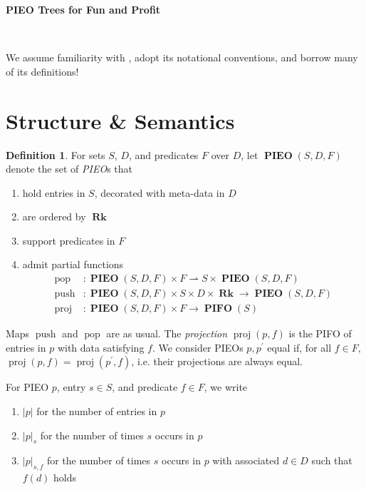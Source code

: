 \documentclass{amsart}
\makeatletter
\DeclareMathOperator{\halfto}{\rightharpoonup}
\DeclareMathOperator{\push}{\mathrm{push}}
\DeclareMathOperator{\pop}{\mathrm{pop}}
\DeclareMathOperator{\proj}{\mathrm{proj}}
\DeclareMathOperator{\Rk}{\mathbf{Rk}}
\DeclareMathOperator{\PIEO}{\mathbf{PIEO}}
\DeclareMathOperator{\PIFO}{\mathbf{PIFO}}
\theoremstyle{definition}
\newtheorem{dfn}[thm]{Definition}
\newcommand{\reqnomode}{\tagsleft@false}
\makeatother
\begin{document}
\pagestyle{empty}

{\LARGE \textbf{PIEO Trees for Fun and Profit}}

\hrulefill\\

\reqnomode

We assume familiarity with \cite{OG}, adopt its notational conventions, and borrow many of its definitions!

\section{Structure \& Semantics}

\begin{dfn}
    \label{dfn:pieo}
    For sets $S$, $D$, and predicates $F$ over $D$,
    let $\PIEO(S, D, F)$ denote the set of \emph{PIEO}s that
    \begin{enumerate}
        \item hold entries in $S$, decorated with meta-data in $D$
        \item are ordered by $\Rk$
        \item support predicates in $F$
        \item admit partial functions 
        \begin{align*}
            \pop &: \PIEO(S, D, F) \times F \halfto S \times \PIEO(S, D, F) \\
            \push &: \PIEO(S, D, F) \times S \times D \times \Rk \to \PIEO(S, D, F) \\
            \proj &: \PIEO(S, D, F) \times F \to \PIFO(S)
        \end{align*}
    \end{enumerate}
    Maps $\push$ and $\pop$ are as usual.
    The \emph{projection} $\proj(p, f)$ is the PIFO of entries in $p$ with data satisfying $f$.
    We consider PIEOs $p, p^\prime$ equal if, for all $f \in F$, $\proj(p,f) = \proj(p^\prime, f)$, i.e. their projections are always equal.

    For PIEO $p$, entry $s \in S$, and predicate $f \in F$, we write 
    \begin{enumerate}
        \item $|p|$ for the number of entries in $p$
        \item $|p|_{s}$ for the number of times $s$ occurs in $p$
        \item $|p|_{s,f}$ for the number of times $s$ occurs in $p$ with associated $d \in D$ such that $f(d)$ holds
    \end{enumerate}
\end{dfn}
\end{document}
